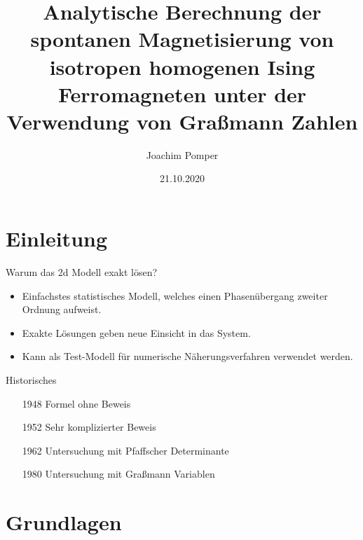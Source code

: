 \documentclass[11pt]{beamer}
\author{Joachim Pomper}
\title{Analytische Berechnung der spontanen Magnetisierung von isotropen homogenen Ising Ferromagneten unter der Verwendung von Graßmann Zahlen}
\institute{Technische Universität Graz}
\date{21.10.2020}
\begin{document}
\begin{frame}
\titlepage
\end{frame}

\begin{frame}
\tableofcontents
\end{frame}

\section{Einleitung}
    
    \begin{frame}{Warum das 2d Modell exakt lösen?}
        \begin{itemize}
            \item Einfachstes statistisches Modell, welches einen Phasenübergang zweiter Ordnung aufweist.
            \item[]
            \pause
            \item Exakte Lösungen geben neue Einsicht in das System.
            \item[]
            \pause
            \item Kann als Test-Modell für numerische Näherungsverfahren verwendet werden.
            \item[]
        \end{itemize}
    \end{frame}
    
    \begin{frame}{Historisches}
                \begin{itemize}
            \item[1948] Formel ohne Beweis 
            \item[]
            \pause
            \item[1952] Sehr komplizierter Beweis 
            \item[]
            \pause
            \item[1962] Untersuchung mit Pfaffscher Determinante
            \item[]
            \pause
            \item[1980] Untersuchung mit Graßmann Variablen
        \end{itemize}
    \end{frame}

\section{Grundlagen}
\end{document}
